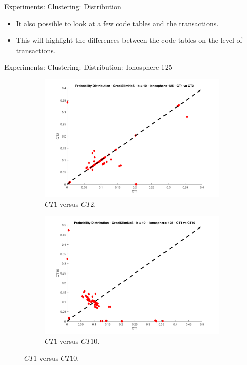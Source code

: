 \documentclass{beamer}
\newcommand{\codetable}{CT}
\begin{document}
\begin{frame}{Experiments: Clustering: Distribution}
	\begin{itemize}
		\item It also possible to look at a few code tables and the transactions.
		\item This will highlight the differences between the code tables on the level of transactions.
	\end{itemize}
\end{frame}

\begin{frame}{Experiments: Clustering: Distribution: Ionosphere-125}
\begin{figure}
  \centering
  \begin{subfigure}[b]{0.45\textwidth}
    \includegraphics[width=\textwidth]{img/proba-iono125-1-2}
    \caption{$\codetable 1$ versus $\codetable 2$.}
  \end{subfigure}
  \begin{subfigure}[b]{0.45\textwidth}
    \includegraphics[width=\textwidth]{img/proba-iono125-1-10}
    \caption{$\codetable 1$ versus $\codetable 10$.}
  \end{subfigure} 
\end{figure}
\end{frame}
\end{document}
